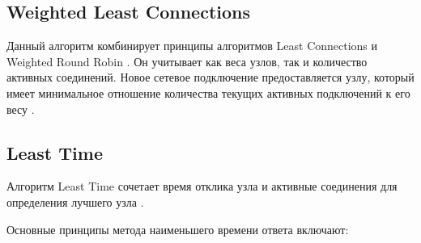 
\subsection{Weighted Least Connections}

Данный алгоритм комбинирует принципы алгоритмов Least Connections и Weighted Round Robin \cite{weightedroundrobin}. %
Он учитывает как веса узлов, так и количество активных соединений. 
Новое сетевое подключение предоставляется узлу, который имеет минимальное отношение количества текущих активных подключений к его весу \cite{mainsource}.


\subsection{Least Time}
Алгоритм Least Time сочетает время отклика узла и активные соединения для определения лучшего узла \cite{balance}. 

Основные принципы метода наименьшего времени ответа включают:


